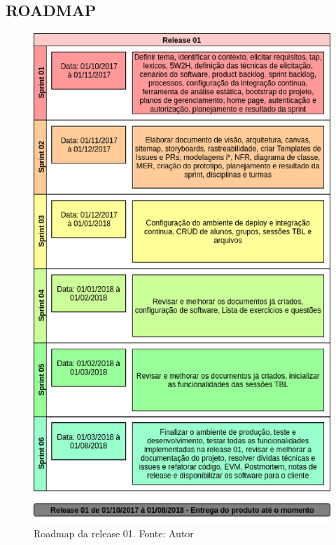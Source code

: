 \begin{apendicesenv}
\chapter{ROADMAP} \label{apendice:roadmap}

\begin{figure}[h!]
	\centering
  \includegraphics[keepaspectratio=true,scale=0.8]{figuras/roadmap1.eps}
  \caption[Roadmap da release 01.]{Roadmap da release 01. Fonte: Autor}
	\label{fig:roadmap1}
\end{figure}


\end{apendicesenv}
